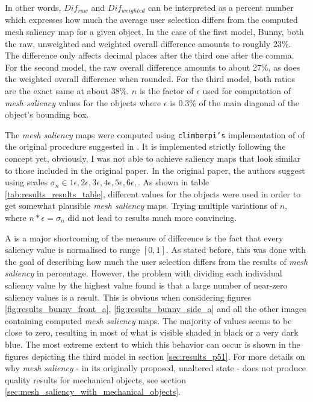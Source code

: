 In other words, $Dif_{raw}$ and $Dif_{weighted}$ can be interpreted as a percent number which expresses how much the average user selection differs from the computed mesh saliency map for a given object. In the case of the first model, Bunny, both the raw, unweighted and weighted overall difference amounts to roughly 23\%. The difference only affects decimal places after the third one after the comma. For the second model, the raw overall difference amounts to about 27\%, as does the weighted overall difference when rounded. For the third model, both ratios are the exact same at about 38\%. $n$ is the factor of $\epsilon$ used for computation of \textit{mesh saliency} values for the objects where $\epsilon$ is 0.3\% of the main diagonal of the object's bounding box.

The \textit{mesh saliency} maps were computed using \texttt{climberpi's} implementation \cite{clms} of of the original procedure suggested in \cite{lee2005mesh}. It is implemented strictly following the concept yet, obviously, I was not able to achieve saliency maps that look similar to those included in the original paper. In the original paper, the authors suggest using scales $\sigma_{n} \in {1\epsilon, 2\epsilon, 3\epsilon, 4\epsilon, 5\epsilon, 6\epsilon, }$. As shown in table \ref{tab:results_results_table}, different values for the objects were used in order to get somewhat plausible \textit{mesh saliency} maps. Trying multiple variations of $n$, where $n*\epsilon = \sigma_{n}$ did not lead to results much more convincing.

A is a major shortcoming of the measure of difference is the fact that every saliency value is normalised to range $[0, 1]$. As stated before, this was done with the goal of describing how much the user selection differs from the results of \textit{mesh saliency} in percentage. However, the problem with dividing each individual saliency value by the highest value found is that a large number of near-zero saliency values is a result. This is obvious when considering figures \ref{fig:results_bunny_front_a}, \ref{fig:results_bunny_side_a} and all the other images containing computed \textit{mesh saliency} maps. The majority of values seems to be close to zero, resulting in most of what is visible shaded in black or a very dark blue. The most extreme extent to which this behavior can occur is shown in the figures depicting the third model in section \ref{sec:results_p51}. For more details on why \textit{mesh saliency} - in its originally proposed, unaltered state - does not produce quality results for mechanical objects, see section \ref{sec:mesh_saliency_with_mechanical_objects}.

